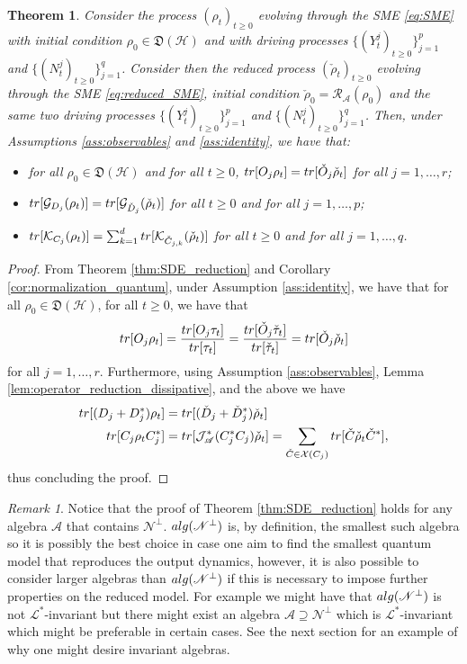 \documentclass[aihp,12pt]{imsart}
\newcommand{\Gc}{\mathcal{G}}
\newcommand{\Hc}{\mathcal{H}}
\newcommand{\Jc}{\mathcal{J}}
\newcommand{\Rc}{\mathcal{R}}
\newcommand{\Kc}{\mathcal{K}}
\newcommand{\Lc}{\mathcal{L}}
\newcommand{\Xc}{\mathcal{X}}
\newcommand{\As}{\mathscr{A}}
\newcommand{\Ns}{\mathscr{N}}
\newcommand{\Df}{\mathfrak{D}}
\newcommand{\tr}{{\rm tr}}
\newcommand{\alg}{{\rm alg}}
\theoremstyle{theorem}
\newtheorem{theorem}{Theorem}
\theoremstyle{definition}
\theoremstyle{remark}
\newtheorem{remark}{Remark}
\begin{document}
\begin{theorem}
    \label{thm:linear_solves_prob_1}
    Consider the process $(\rho_t)_{t\geq0}$ evolving through the SME \eqref{eq:SME} with initial condition $\rho_0\in\Df(\Hc)$ and with driving processes $\{(Y_t^j)_{t\geq0}\}_{j=1}^p$ and $\{(N_t^j)_{t\geq0}\}_{j=1}^q$. Consider then the reduced process $(\check{\rho}_t)_{t\geq0}$ evolving through the SME \eqref{eq:reduced_SME}, initial condition $\check{\rho}_0=\Rc_\As(\rho_0)$ and the same two driving processes $\{(Y_t^j)_{t\geq0}\}_{j=1}^p$ and $\{(N_t^j)_{t\geq0}\}_{j=1}^q$. Then, under Assumptions \ref{ass:observables} and \ref{ass:identity}, we have that:
    \begin{itemize}
        \item for all $\rho_0\in\Df(\Hc)$ and for all $t\geq0$, $\tr[O_j\rho_t]=\tr[\check{O}_j \check{\rho}_t]$ for all $j=1,\dots,r$;
        \item $\tr[\Gc_{D_j}(\rho_t)] = \tr[\Gc_{\check{D}_j}(\check{\rho}_t)]$ for all $t\geq0$ and for all $j=1,\dots,p$;
        \item $\tr[\Kc_{C_j}(\rho_t)] = \sum_{k=1}^{d} \tr[\Kc_{\check{C}_{j,k}}(\check{\rho}_t)]$ for all $t\geq0$ and for all $j=1,\dots,q$.
    \end{itemize} 
\end{theorem}
\begin{proof}
    From Theorem \ref{thm:SDE_reduction} and Corollary \ref{cor:normalization_quantum}, under Assumption \ref{ass:identity}, we have that for all $\rho_0\in\Df(\Hc)$, for all $t\geq0$, we have that \[\tr[O_j \rho_t] = \frac{\tr[O_j \tau_t]}{\tr[\tau_t]} = \frac{\tr[\check{O}_j \check{\tau}_t]}{\tr[\check{\tau}_t]} = \tr[\check{O}_j\check{\rho}_t]\]
    for all $j=1,\dots,r$. Furthermore, using Assumption \ref{ass:observables}, Lemma \ref{lem:operator_reduction_dissipative}, and the above we have 
    \begin{align*}
        \tr[(D_j+D_j^*)\rho_t] &= \tr[(\check{D}_j+\check{D}_j^*)\check{\rho}_t]\\
        \tr[C_j\rho_t C_j^*] &= \tr[\Jc_\As^*(C_j^* C_j)\check{\rho}_t] = \sum_{\check{C}\in\Xc(C_j)}\tr[\check{C}\check{\rho}_t\check{C}^*],
    \end{align*}
    thus concluding the proof.
\end{proof}

\begin{remark}
    Notice that the proof of Theorem \ref{thm:SDE_reduction} holds for any algebra $\As$ that contains $\Ns^\perp$. $\alg(\Ns^\perp)$ is, by definition, the smallest such algebra so it is possibly the best choice in case one aim to find the smallest quantum model that reproduces the output dynamics, however, it is also possible to consider larger algebras than $\alg(\Ns^\perp)$ if this is necessary to impose further properties on the reduced model. For example we might have that $\alg(\Ns^\perp)$ is not $\Lc^*$-invariant but there might exist an algebra $\As\supseteq\Ns^\perp$ which is $\Lc^*$-invariant which might be preferable in certain cases. See the next section for an example of why one might desire invariant algebras. 
\end{remark}
\end{document}
